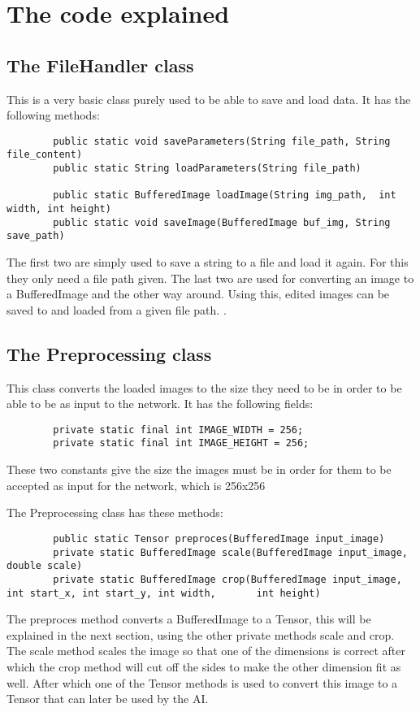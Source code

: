 \documentclass[12pt, titlepage]{article}
\let\oldsection\section
\renewcommand\section{\clearpage\oldsection}
\begin{document}
		\section{The code explained}
		
		\subsection{The FileHandler class} \label{Filehandler}
		This is a very basic class purely used to be able to save and load data. It has the following methods:
		\begin{lstlisting}
		public static void saveParameters(String file_path, String file_content) 	
		public static String loadParameters(String file_path)
		
		public static BufferedImage loadImage(String img_path,  int width, int height)
		public static void saveImage(BufferedImage buf_img, String save_path)
		\end{lstlisting}
		The first two are simply used to save a string to a file and load it again. For this they only need a file path given. The last two are used for converting an image to a BufferedImage and the other way around. Using this, edited images can be saved to and loaded from a given file path.
		.
		\pagebreak
		
		\subsection{The Preprocessing class} \label{preprocess}
		This class converts the loaded images to the size they need to be in order to be able to be as input to the network.
		It has the following fields:
		\begin{lstlisting}
		private static final int IMAGE_WIDTH = 256;
		private static final int IMAGE_HEIGHT = 256;
		\end{lstlisting}
		
		These two constants give the size the images must be in order for them to be accepted as input for the network, which is 256x256
		
		The Preprocessing class has these methods:
		\begin{lstlisting}
		public static Tensor preproces(BufferedImage input_image)
		private static BufferedImage scale(BufferedImage input_image, double scale)
		private static BufferedImage crop(BufferedImage input_image, int start_x, int start_y, int width, 		int height)
		\end{lstlisting}
		The preproces method converts a BufferedImage to a Tensor, this will be explained in the next section, using the other private methods scale and crop.
		The scale method scales the image so that one of the dimensions is correct after which the crop method will cut off the sides to make the other dimension fit as well. After which one of the Tensor methods is used to convert this image to a Tensor that can later be used by the AI. 	
		\pagebreak
		
\end{document}
